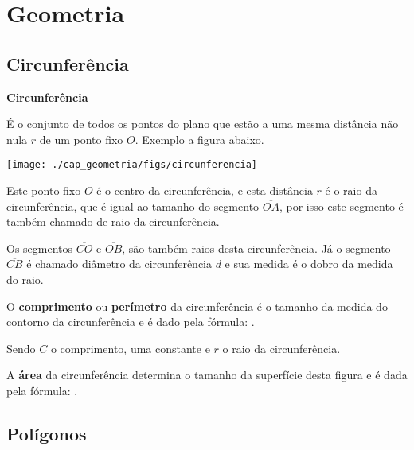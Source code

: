 
\chapter{Geometria}
\section{Circunferência}

\vskip0.3cm

\colorbox{azul}{
 \begin{minipage}{0.9\linewidth}
 \begin{center}
 \textbf{Circunferência}

  É o conjunto de todos os pontos do plano que estão a uma mesma distância não nula $r$ de um ponto fixo $O$. Exemplo a figura abaixo.
 \end{center}
 \end{minipage}}

 \vskip0.3cm

 \begin{center}
 \texttt{[image: ./cap\_geometria/figs/circunferencia]}
 \end{center}

Este ponto fixo $O$ é o centro da circunferência, e esta distância $r$ é o raio da circunferência, que é igual ao tamanho do segmento $\overline{OA}$, por isso este segmento é também chamado de raio da circunferência.

Os segmentos $\overline{CO}$ e $\overline{OB}$, são também raios desta circunferência. Já o segmento $\overline{CB}$ é chamado diâmetro da circunferência $d$ e sua medida é o dobro da medida do raio.

O \textbf{comprimento} ou \textbf{perímetro} da circunferência é o tamanho da medida do contorno da circunferência e é dado pela fórmula:
.

Sendo $C$ o comprimento,  uma constante e $r$ o raio da circunferência.

A \textbf{área} da circunferência determina o tamanho da superfície desta figura e é dada pela fórmula:
.


\section{Polígonos}

